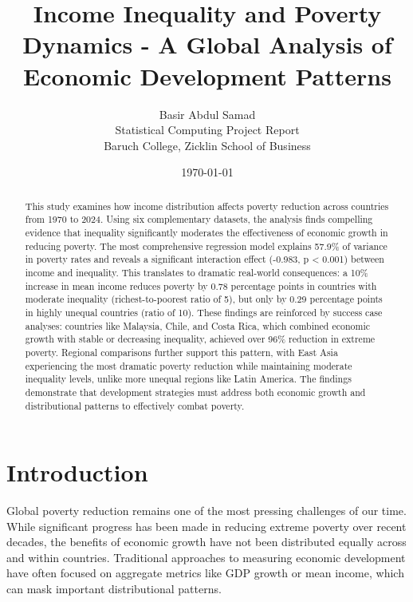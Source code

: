 \documentclass[12pt,a4paper]{article}
\begin{document}
\title{Income Inequality and Poverty Dynamics - A Global Analysis of Economic Development Patterns}
\author{Basir Abdul Samad \\
Statistical Computing Project Report \\
Baruch College, Zicklin School of Business}
\date{\today}

\maketitle

\begin{abstract}
This study examines how income distribution affects poverty reduction across countries from 1970 to 2024. Using six complementary datasets, the analysis finds compelling evidence that inequality significantly moderates the effectiveness of economic growth in reducing poverty. The most comprehensive regression model explains 57.9\% of variance in poverty rates and reveals a significant interaction effect (-0.983, p < 0.001) between income and inequality. This translates to dramatic real-world consequences: a 10\% increase in mean income reduces poverty by 0.78 percentage points in countries with moderate inequality (richest-to-poorest ratio of 5), but only by 0.29 percentage points in highly unequal countries (ratio of 10). These findings are reinforced by success case analyses: countries like Malaysia, Chile, and Costa Rica, which combined economic growth with stable or decreasing inequality, achieved over 96\% reduction in extreme poverty. Regional comparisons further support this pattern, with East Asia experiencing the most dramatic poverty reduction while maintaining moderate inequality levels, unlike more unequal regions like Latin America. The findings demonstrate that development strategies must address both economic growth and distributional patterns to effectively combat poverty.
\end{abstract}

\tableofcontents
\listoffigures
\newpage

\section{Introduction}\label{sec:introduction}
Global poverty reduction remains one of the most pressing challenges of our time. While significant progress has been made in reducing extreme poverty over recent decades, the benefits of economic growth have not been distributed equally across and within countries. Traditional approaches to measuring economic development have often focused on aggregate metrics like GDP growth or mean income, which can mask important distributional patterns.
\end{document}
